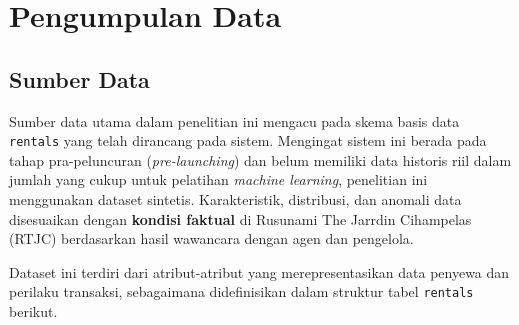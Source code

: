 \section{Pengumpulan Data}

\subsection{Sumber Data}

Sumber data utama dalam penelitian ini mengacu pada skema basis data \texttt{rentals} yang telah dirancang pada sistem. Mengingat sistem ini berada pada tahap pra-peluncuran (\textit{pre-launching}) dan belum memiliki data historis riil dalam jumlah yang cukup untuk pelatihan \textit{machine learning}, penelitian ini menggunakan dataset sintetis. Karakteristik, distribusi, dan anomali data disesuaikan dengan {\bf kondisi faktual} di Rusunami The Jarrdin Cihampelas (RTJC) berdasarkan hasil wawancara dengan agen dan pengelola.

Dataset ini terdiri dari atribut-atribut yang merepresentasikan data penyewa dan perilaku transaksi, sebagaimana didefinisikan dalam struktur tabel \texttt{rentals} berikut.

